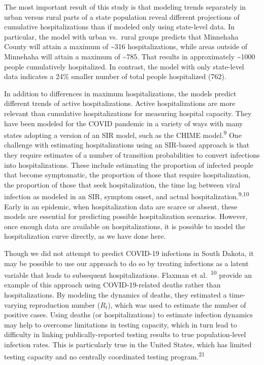 \documentclass[
]{article}
\begin{document}
The most important result of this study is that modeling trends separately in urban versus rural parts of a state population reveal different projections of cumulative hospitalizations than if modeled only using state-level data. In particular, the model with urban vs.~rural groups predicts that Minnehaha County will attain a maximum of \textasciitilde316 hospitalizations, while areas outside of Minnehaha will attain a maximum of \textasciitilde785. That results in approximately \textasciitilde1000 people cumulatively hospitalized. In contrast, the model with only state-level data indicates a 24\% smaller number of total people hospitalized (762).

In addition to differences in maximum hospitalizations, the models predict different trends of active hospitalizations. Active hospitalizations are more relevant than cumulative hospitalizations for measuring hospital capacity. They have been modeled for the COVID pandemic in a variety of ways with many states adopting a version of an SIR model, such as the CHIME model.\textsuperscript{9} One challenge with estimating hospitalizations using an SIR-based approach is that they require estimates of a number of transition probabilities to convert infections into hospitalizations. These include estimating the proportion of infected people that become symptomatic, the proportion of those that require hospitalization, the proportion of those that seek hospitalization, the time lag between viral infection as modeled in an SIR, symptom onset, and actual hospitalization.\textsuperscript{9,10} Early in an epidemic, when hospitalization data are scarce or absent, these models are essential for predicting possible hospitalization scenarios. However, once enough data are available on hospitalizations, it is possible to model the hospitalization curve directly, as we have done here.

Though we did not attempt to predict COVID-19 infections in South Dakota, it may be possible to use our approach to do so by treating infections as a latent variable that leads to subsequent hospitalizations. Flaxman et al.~\textsuperscript{10} provide an example of this approach using COVID-19-related deaths rather than hospitalizations. By modeling the dynamics of deaths, they estimated a time-varying reproduction number (\(R_t\)), which was used to estimate the number of positive cases. Using deaths (or hospitalizations) to estimate infection dynamics may help to overcome limitations in testing capacity, which in turn lead to difficulty in linking publically-reported testing results to true population-level infection rates. This is particularly true in the United States, which has limited testing capacity and no centrally coordinated testing program.\textsuperscript{21}
\end{document}
